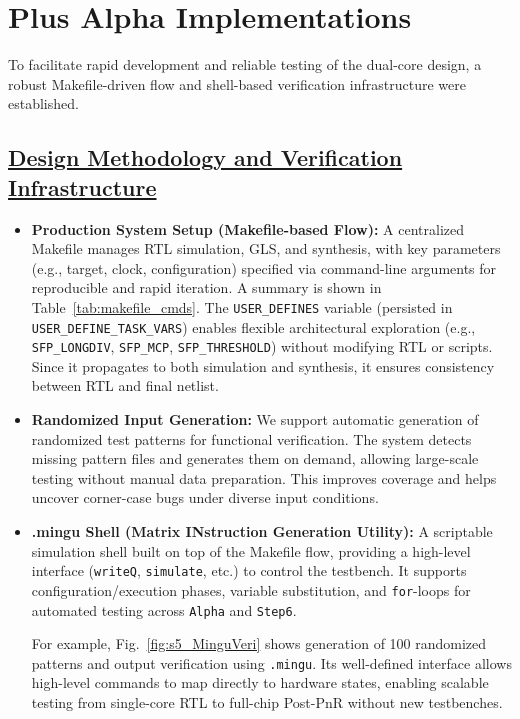 \documentclass[journal]{IEEEtran}
\begin{document}
\section{Plus Alpha Implementations}
To facilitate rapid development and reliable testing of the dual-core design, a robust Makefile-driven flow and shell-based verification infrastructure were established.
\subsection{\underline{\textnormal{Design Methodology and Verification Infrastructure}}}
\begin{itemize}

    \item \textbf{Production System Setup (Makefile-based Flow):} 
    A centralized Makefile manages RTL simulation, GLS, and synthesis, with key parameters (e.g., target, clock, configuration) specified via command-line arguments for reproducible and rapid iteration. A summary is shown in Table~\ref{tab:makefile_cmds}.
    The \texttt{USER\_DEFINES} variable (persisted in \texttt{USER\_DEFINE\_TASK\_VARS}) enables flexible architectural exploration (e.g., \texttt{SFP\_LONGDIV}, \texttt{SFP\_MCP}, \texttt{SFP\_THRESHOLD}) without modifying RTL or scripts. Since it propagates to both simulation and synthesis, it ensures consistency between RTL and final netlist.
    

    \item \textbf{Randomized Input Generation:} 
    We support automatic generation of randomized test patterns for functional verification. 
    The system detects missing pattern files and generates them on demand, allowing large-scale testing without manual data preparation. 
    This improves coverage and helps uncover corner-case bugs under diverse input conditions.

    \item \textbf{.mingu Shell (Matrix INstruction Generation Utility):}
    A scriptable simulation shell built on top of the Makefile flow, providing a
    high-level interface (\texttt{writeQ}, \texttt{simulate}, etc.) to control the
    testbench. It supports configuration/execution phases, variable substitution,
    and \texttt{for}-loops for automated testing across \texttt{Alpha} and \texttt{Step6}.
   

   For example, Fig.~\ref{fig:s5_MinguVeri} shows generation of 100 randomized patterns and output verification using \texttt{.mingu}. Its well-defined interface allows high-level commands to map directly to hardware states, enabling scalable testing from single-core RTL to full-chip Post-PnR without new testbenches.
   
\end{itemize}
\end{document}
